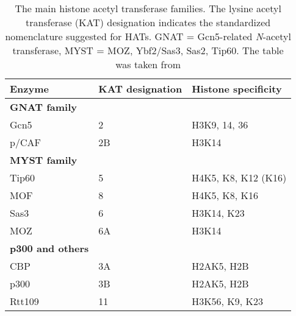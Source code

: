 \vspace*{-2em}
\begin{table}[t]
\begin{singlespacing}
\begin{small}
\begin{sffamily}
\caption[The main histone acetyl transferase families.]{\textsf{The main histone acetyl transferase families. The lysine acetyl transferase (KAT) designation indicates the standardized nomenclature suggested for HATs. GNAT = Gcn5-related \textsl{N}-acetyl transferase, MYST = MOZ, Ybf2/Sas3, Sas2, Tip60. The table was taken from \citet{Berndsen2008}}} %
\label{tab:HATs}
\begin{tabular}{>{\small\textsf\bgroup}p{3.5cm}<{\egroup} >{\small\textsf\bgroup}p{3.5cm}<{\egroup} >{\small\textsf\bgroup}p{5cm}<{\egroup} }
\textbf{Enzyme} & \textbf{KAT designation} & \textbf{Histone specificity}
\tabularnewline \toprule
\textbf{GNAT family} & & \\
Gcn5 & 2 & H3K9, 14, 36 \\
p/CAF & 2B & H3K14
\tabularnewline \midrule
\textbf{MYST family} & & \\
Tip60 & 5 & H4K5, K8, K12 (K16) \\
MOF 	&	8	&	H4K5, K8, K16 \\
Sas3	&	6	&	H3K14, K23 \\
MOZ		&	6A & H3K14
\tabularnewline \midrule
\textbf{p300 and others} & & \\
CBP & 3A & H2AK5, H2B \\
p300 	&	3B	&	H2AK5, H2B \\
Rtt109	&	11 & H3K56, K9, K23	
\tabularnewline \bottomrule
\end{tabular}
\end{sffamily}
\end{small}
\end{singlespacing}
\end{table}
